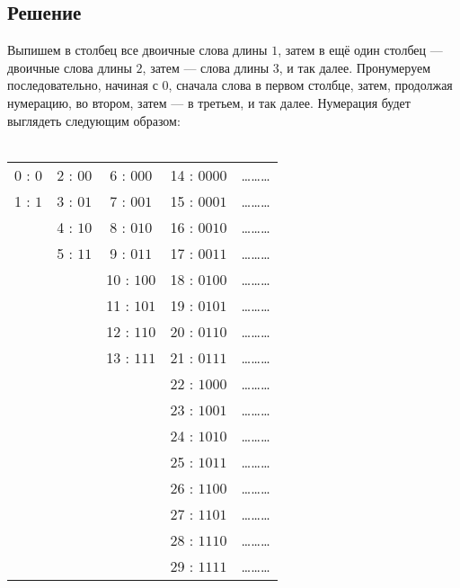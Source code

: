\documentclass[a4paper,12pt]{article}
\begin{document}
	\subsection*{Решение}
	Выпишем в столбец все двоичные слова длины $1$, затем в ещё один столбец --- двоичные слова длины $2$, затем --- слова длины $3$, и так далее. Пронумеруем последовательно, начиная с $0$, сначала слова в первом столбце, затем, продолжая нумерацию, во втором, затем --- в третьем, и так далее. Нумерация будет выглядеть следующим образом: \\\\
	{
	\boldmath
	\begin{tabular}{c c c c c}
	   0 : $0$  & 2 : $00$ & \phantom{1}6 : $000$ & 14 : $0000$ & \ldots\ldots\ldots\\
	   1 : $1$  & 3 : $01$ & \phantom{1}7 : $001$ & 15 : $0001$ & \ldots\ldots\ldots\\
	            & 4 : $10$ & \phantom{1}8 : $010$ & 16 : $0010$ & \ldots\ldots\ldots\\
	            & 5 : $11$ & \phantom{1}9 : $011$ & 17 : $0011$ & \ldots\ldots\ldots\\
	            &          & 10 : $100$           & 18 : $0100$ & \ldots\ldots\ldots\\
	            &          & 11 : $101$           & 19 : $0101$ & \ldots\ldots\ldots\\
	            &          & 12 : $110$           & 20 : $0110$ & \ldots\ldots\ldots\\
                &          & 13 : $111$           & 21 : $0111$ & \ldots\ldots\ldots\\
	            &          &                      & 22 : $1000$ & \ldots\ldots\ldots\\
	            &          &                      & 23 : $1001$ & \ldots\ldots\ldots\\
	            &          &                      & 24 : $1010$ & \ldots\ldots\ldots\\
	            &          &                      & 25 : $1011$ & \ldots\ldots\ldots\\
	            &          &                      & 26 : $1100$ & \ldots\ldots\ldots\\
	            &          &                      & 27 : $1101$ & \ldots\ldots\ldots\\
	            &          &                      & 28 : $1110$ & \ldots\ldots\ldots\\
	            &          &                      & 29 : $1111$ & \ldots\ldots\ldots\\
	      
	   \end{tabular}
	}
\end{document}
